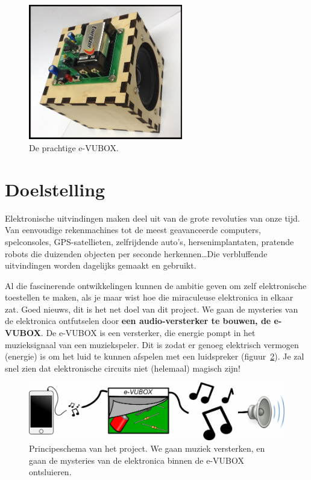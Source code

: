 \documentclass{article}
\begin{document}
	\maketitle

	\begin{figure}[htbp]
		\centering
		\includegraphics[width=0.6\textwidth]{foto.jpg}
		\caption{De prachtige e-VUBOX.}
		\label{fig:foto}
	\end{figure}

	\clearpage
	\tableofcontents
	\clearpage
{}
	\section{Doelstelling}
		Elektronische uitvindingen maken deel uit van de grote revoluties van onze tijd. Van eenvoudige rekenmachines tot de meest geavanceerde computers, spelconsoles, GPS-satellieten, zelfrijdende auto's, hersenimplantaten, pratende robots die duizenden objecten per seconde herkennen\ldots Die verbluffende uitvindingen worden dagelijks gemaakt en gebruikt.

		Al die fascinerende ontwikkelingen kunnen de ambitie geven om zelf elektronische toestellen te maken, als je maar wist hoe die miraculeuse elektronica in elkaar zat. Goed nieuws, dit is het net doel van dit project. We gaan de mysteries van de elektronica ontfutselen door \textbf{een audio-versterker te bouwen, de e-VUBOX}. De e-VUBOX is een versterker, die energie pompt in het muzieksignaal van een muziekspeler. Dit is zodat er genoeg elektrisch vermogen (energie) is om het luid te kunnen afspelen met een luidspreker (figuur~\ref{fig:principe}). Je zal snel zien dat elektronische circuits niet (helemaal) magisch zijn!

		\begin{figure}[htbp]
			\centering
			\includegraphics[scale=0.7]{principe}
			\caption{Principeschema van het project. We gaan muziek versterken, en gaan de mysteries van de elektronica binnen de e-VUBOX ontsluieren.}
			\label{fig:principe}
		\end{figure}
\end{document}
